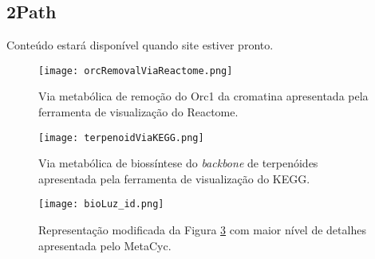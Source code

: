 

\subsection{2Path}

\indent Conteúdo estará disponível quando site estiver pronto. \\




\begin{figure}[!h]
\centering
\texttt{[image: orcRemovalViaReactome.png]}
\caption{Via metabólica de remoção do Orc1 da cromatina apresentada pela ferramenta de visualização do Reactome.}
\label{orcRemovalViaReactome}
\end{figure}

\begin{figure}[!h]
\centering
\texttt{[image: terpenoidViaKEGG.png]}
\caption{Via metabólica de biossíntese do \textit{backbone} de terpenóides apresentada pela ferramenta de visualização do KEGG.}
\label{terpenoidBackboneKEGG}
\end{figure}

\begin{figure}[!h]
\centering
\texttt{[image: bioLuz\_id.png]}
\caption{Representação modificada da Figura \ref{bioLuz_id} com maior nível de detalhes apresentada pelo MetaCyc.}
\label{bioLuz_id}
\end{figure}